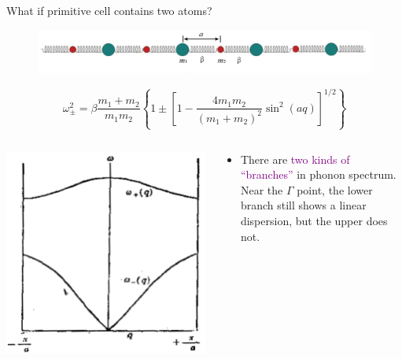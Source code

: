 \documentclass{beamer}
\begin{document}
\begin{frame}{What if primitive cell contains two atoms?}
  \begin{figure}
    \centering\includegraphics[width=\textwidth]{figure/atom_chain_2.png}
  \end{figure}
  \begin{equation}
      \omega_\pm^2 = \beta\frac{m_1+m_2}{m_1m_2}\left\{1\pm[1-\frac{4m_1m_2}{(m_1+m_2)^2}\sin^2(aq)]^{1/2}\right\}
  \end{equation}
  \begin{columns}
    \begin{column}{0.35\textwidth}
      \includegraphics[width=\textwidth]{figure/1dc2-solution.png}
    \end{column}
    \begin{column}{0.65\textwidth}
      \begin{block}{}\begin{itemize}\footnotesize
        \item There are \textcolor{purple}{two kinds of ``branches''} in phonon spectrum. Near the \(\Gamma\) point, the lower branch still shows a linear dispersion, but the upper does not.

\end{itemize}
\end{block}
\end{column}
\end{columns}
\end{frame}
\end{document}
